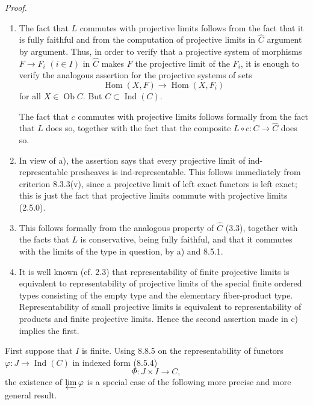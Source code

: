 \documentclass[11pt]{article}
\newcommand{\Ob}{\operatorname{Ob}}
\newcommand{\Hom}{\operatorname{Hom}}
\newcommand{\Ind}{\operatorname{Ind}}
\newenvironment{prooftext}{\par\noindent\emph{Proof.}\ }{\par\medskip}
\begin{document}
\begin{prooftext}
\begin{enumerate}[label=\alph*)]
\item The fact that $L$ commutes with projective limits follows from the fact that it is fully faithful and from the computation of projective limits in $\widehat C$ argument by argument. Thus, in order to verify that a projective system of morphisms $F\to F_i$ $(i\in I)$ in $\widehat C$ makes $F$ the projective limit of the $F_i$, it is enough to verify the analogous assertion for the projective systems of sets
\[
 \Hom(X,F)\longrightarrow \Hom(X,F_i)
\]
for all $X\in\Ob C$. But $C\subset\Ind(C)$.

The fact that $c$ commutes with projective limits follows formally from the fact that $L$ does so, together with the fact that the composite $L\circ c:C\to\widehat C$ does so.

\item In view of a), the assertion says that every projective limit of ind-representable presheaves is ind-representable. This follows immediately from criterion 8.3.3(v), since a projective limit of left exact functors is left exact; this is just the fact that projective limits commute with projective limits (2.5.0).

\item This follows formally from the analogous property of $\widehat C$ (3.3), together with the facts that $L$ is conservative, being fully faithful, and that it commutes with the limits of the type in question, by a) and 8.5.1.

\item It is well known (cf. 2.3) that representability of finite projective limits is equivalent to representability of projective limits of the special finite ordered types consisting of the empty type and the elementary fiber-product type. Representability of small projective limits is equivalent to representability of products and finite projective limits. Hence the second assertion made in c) implies the first.
\end{enumerate}

First suppose that $I$ is finite. Using 8.8.5 on the representability of functors $\varphi:J\to\Ind(C)$ in indexed form (8.5.4)
\[
 \Phi:J\times I\longrightarrow C,
\tag{8.9.1.1}
\]
the existence of $\varprojlim\varphi$ is a special case of the following more precise and more general result.
\end{prooftext}
\end{document}
